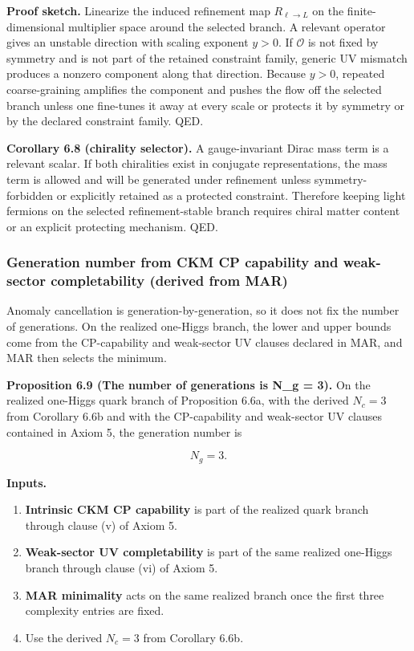 \textbf{Proof sketch.} Linearize the induced refinement map \(R_{\ell\to L}\) on the finite-dimensional multiplier space around the selected branch. A relevant operator gives an unstable direction with scaling exponent \(y>0\). If \(\mathcal{O}\) is not fixed by symmetry and is not part of the retained constraint family, generic UV mismatch produces a nonzero component along that direction. Because \(y>0\), repeated coarse-graining amplifies the component and pushes the flow off the selected branch unless one fine-tunes it away at every scale or protects it by symmetry or by the declared constraint family. QED.

\textbf{Corollary 6.8 (chirality selector).} A gauge-invariant Dirac mass term is a relevant scalar. If both chiralities exist in conjugate representations, the mass term is allowed and will be generated under refinement unless symmetry-forbidden or explicitly retained as a protected constraint. Therefore keeping light fermions on the selected refinement-stable branch requires chiral matter content or an explicit protecting mechanism. QED.

\subsubsection{Generation number from CKM CP capability and weak-sector completability (derived from MAR)}\label{64-generation-number-from-cp-violation-and-refinement-stability-derived-from-mar}

Anomaly cancellation is generation-by-generation, so it does not fix the number of generations. On the realized one-Higgs branch, the lower and upper bounds come from the CP-capability and weak-sector UV clauses declared in MAR, and MAR then selects the minimum.

\textbf{Proposition 6.9 (The number of generations is N\_g = 3).} On the realized one-Higgs quark branch of Proposition 6.6a, with the derived \(N_c=3\) from Corollary 6.6b and with the CP-capability and weak-sector UV clauses contained in Axiom 5, the generation number is

\[
N_g = 3.
\]

\textbf{Inputs.}

\begin{enumerate}
\def\labelenumi{\arabic{enumi}.}
\tightlist
\item
  \textbf{Intrinsic CKM CP capability} is part of the realized quark branch through clause (v) of Axiom 5.
\item
  \textbf{Weak-sector UV completability} is part of the same realized one-Higgs branch through clause (vi) of Axiom 5.
\item
  \textbf{MAR minimality} acts on the same realized branch once the first three complexity entries are fixed.
\item
  Use the derived \(N_c = 3\) from Corollary 6.6b.
\end{enumerate}

